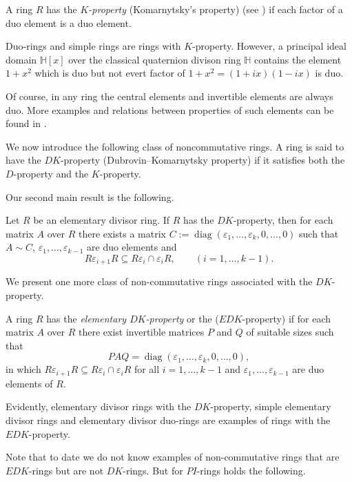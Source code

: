 \documentclass{cimart}
\DeclareMathOperator\diag{diag}
\begin{document}
A ring  $R$ has the {\it  $K$-property} (Komarnytsky's property)  (see \cite{Komarnitskii}) if  each  factor of a duo element is a duo  element.

Duo-rings and simple rings are rings with $K$-property. However,   a principal ideal domain $\mathbb{H}[x]$ over the classical quaternion divison ring $\mathbb{H}$ contains the  element $1+x^2$ which  is duo but not evert factor of $1+x^2=(1+ix)(1-ix)$ is  duo.


Of course, in any ring the central elements and invertible elements are always duo. More examples and relations between properties of such elements  can be found in \cite{Cheon_Kwak_Lee_Piao_Yun, 3-dubrovin, Gatalevich, Kim_Kwak_Lee, Kosan_Lee_Zhou, 2-zabkom, 1-zabavsky}.


We now introduce the following class of noncommutative rings. A ring is said to have the $DK$-property (Dubrovin–Komarnytsky property) if it satisfies both the $D$-property and the $K$-property.

\smallskip
Our second main result is the following.


\begin{theorem}\label{ThR:2} Let $R$ be an elementary divisor ring.  If $R$ has the $DK$-property, then  for each  matrix $A$ over $R$ there exists a matrix $C:=\diag(\varepsilon_1,\ldots, \varepsilon_k, 0,\ldots,0)$  such that $A\sim C$, $\varepsilon_1, \ldots, \varepsilon_{k-1}$ are duo elements  and \[ R\varepsilon_{i+1}R\subseteq R\varepsilon_i\cap \varepsilon_iR, \qquad  (i=1,\dots, k-1).
\]
\end{theorem}

We present one more class of non-commutative rings associated with the $DK$-property.

A ring $R$ has the {\it  elementary   $DK$-property} or the ($EDK$-property) if for each  matrix $A$ over $R$ there exist invertible matrices $P$ and $Q$ of suitable sizes such that
\[
PAQ=\diag(\varepsilon_1,\ldots, \varepsilon_k, 0,\ldots,0),
\]
in which  $R\varepsilon_{i+1}R\subseteq R\varepsilon_i\cap \varepsilon_iR$ for all $i=1,\dots, k-1$ and  $\varepsilon_{1},\ldots, \varepsilon_{k-1}$ are  duo elements of $R$.

Evidently, elementary divisor rings with the $DK$-property, simple elementary divisor rings and elementary divisor duo-rings are examples of  rings with the $EDK$-property.
\smallskip

Note that to date  we do not know examples of non-commutative rings that are $EDK$-rings but are not $DK$-rings. But for $PI$-rings holds the following.
\end{document}
